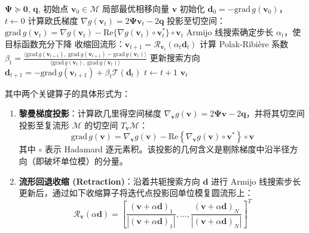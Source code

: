 \begin{algorithm}[t]
\caption{单位模约束下的黎曼共轭梯度法}
\label{alg:rcg}
\begin{algorithmic}[1]
\REQUIRE $\bm{\Psi} \succeq \bm{0}$, $\bm{q}$, 初始点 $\bm{v}_0 \in \mathcal{M}$
\ENSURE 局部最优相移向量 $\bm{v}$
\STATE 初始化 $\bm{d}_0 = -\mathrm{grad}\,g(\bm{v}_0)$，$t \leftarrow 0$
\REPEAT
  \STATE 计算欧氏梯度 $\nabla g(\bm{v}_t) = 2\bm{\Psi}\bm{v}_t - 2\bm{q}$
  \STATE 投影至切空间：$\mathrm{grad}\,g(\bm{v}_t) = \nabla g(\bm{v}_t) - \mathrm{Re}\{\nabla g(\bm{v}_t)\circ\bm{v}_t^*\}\circ\bm{v}_t$
  \STATE Armijo 线搜索确定步长 $\alpha_t$，使目标函数充分下降
  \STATE 收缩回流形：$\bm{v}_{t+1} = \mathcal{R}_{\bm{v}_t}(\alpha_t \bm{d}_t)$
  \STATE 计算 Polak-Ribière 系数 $\beta_t = \frac{\langle \mathrm{grad}\,g(\bm{v}_{t+1}),\ \mathrm{grad}\,g(\bm{v}_{t+1}) - \mathrm{grad}\,g(\bm{v}_t)\rangle}{\langle \mathrm{grad}\,g(\bm{v}_t),\ \mathrm{grad}\,g(\bm{v}_t)\rangle}$
  \STATE 更新搜索方向 $\bm{d}_{t+1} = -\mathrm{grad}\,g(\bm{v}_{t+1}) + \beta_t \mathcal{T}(\bm{d}_t)$
  \STATE $t \leftarrow t+1$
\RETURN $\bm{v}_t$
\end{algorithmic}
\end{algorithm}

其中两个关键算子的具体形式为：
\begin{enumerate}
  \item \textbf{黎曼梯度投影}：计算欧几里得空间梯度 $\nabla_{\bm{v}} g(\bm{v}) = 2\bm{\Psi}\bm{v} - 2\bm{q}$，并将其切空间投影至复流形 $\mathcal{M}$ 的切空间 $T_{\bm{v}}\mathcal{M}$：
    \begin{equation}
      \mathrm{grad} \, g(\bm{v}) = \nabla_{\bm{v}} g(\bm{v}) - \mathrm{Re}\left\{ \nabla_{\bm{v}} g(\bm{v}) \circ \bm{v}^* \right\} \circ \bm{v}
      \label{eq:riemannian_grad}
    \end{equation}
    其中 $\circ$ 表示 Hadamard 逐元素积。该投影的几何含义是剔除梯度中沿半径方向（即破坏单位模）的分量。
  \item \textbf{流形回退收缩 (Retraction)}：沿着共轭搜索方向 $\bm{d}$ 进行 Armijo 线搜索步长更新后，通过如下收缩算子将迭代点投影回单位模复圆流形上：
    \begin{equation}
      \mathcal{R}_{\bm{v}}(\alpha \bm{d}) = \left[ \frac{(\bm{v} + \alpha \bm{d})_1}{|(\bm{v} + \alpha \bm{d})_1|}, \dots, \frac{(\bm{v} + \alpha \bm{d})_N}{|(\bm{v} + \alpha \bm{d})_N|} \right]^T
      \label{eq:manifold_retraction}
    \end{equation}
\end{enumerate}

